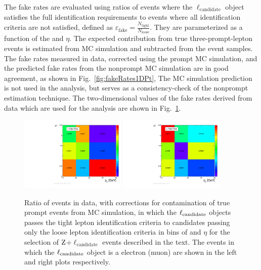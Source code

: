 The fake rates are evaluated 
using ratios of events where the $\ell_{\mathrm{candidate}}$ 
object satisfies the full identification requirements 
to events where all identification criteria are not satisfied, defined as
$\varepsilon_{\text{fake}} = \frac{N_{\text{tight}}}{N_\text{loose}}$.
They are parameterized as a function of the {\lcand} \PT and $\eta$. 
The expected contribution from true three-prompt-lepton events is
estimated from MC simulation and subtracted from the event samples.
The fake rates measured in data, corrected using the prompt MC simulation,
and the predicted fake rates from the nonprompt MC simulation
are in good agreement, as shown in Fig.~\ref{fig:fakeRates1DPt}, 
The MC simulation prediction is not used in the analysis, but serves as a consistency-check
of the nonprompt estimation technique.
The two-dimensional values of the fake rates derived from data which are used for
the analysis are shown in Fig.~\ref{fig:fakeRates2D}.

\begin{figure}[htbp]
  \centering
   \includegraphics[width=0.45\textwidth]{figures/AnalysisProcedure/ratio2D_allE.pdf}
   \includegraphics[width=0.45\textwidth]{figures/AnalysisProcedure/ratio2D_allMu.pdf}
  \caption{
    Ratio of events in data, with corrections for contamination of true prompt events from MC simulation,
    in which the $\ell_{\rm candidate}$ objects passes the tight lepton 
    identification criteria to candidates passing only the loose lepton identification 
    criteria in bins of \PT and $\eta$ for the selection of $\mathrm{Z}$+$\ell_{\mathrm{candidate}}$ 
    events described in the text.
    The events in which the $\ell_{\rm candidate}$ object is a electron (muon) are shown in 
    the left and right plots respectively. 
        }
 \label{fig:fakeRates2D}
\end{figure}



